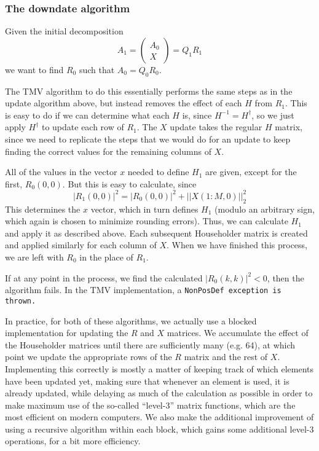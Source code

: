 \subsubsection{The downdate algorithm}
\label{QRDowndate_Algorithm}

Given the initial decomposition
\begin{equation*}
A_1 = \left(\begin{array}{c}A_0 \\ X \end{array}\right) = Q_1 R_1 
\end{equation*}
we want to find $R_0$ such that $A_0 = Q_0 R_0$.

The TMV algorithm to do this essentially performs the same steps as in the update
algorithm above,
but instead removes the effect of each $H$ from $R_1$.
This is easy to
do if we can determine what each $H$ is, since $H^{-1} = H^\dagger$, so we just
apply $H^\dagger$ to update each row of $R_1$.  The $X$ update takes
the regular $H$ matrix, since we need to replicate the steps that we would do
for an update to keep finding the correct values for the remaining columns of $X$.

All of the values in the vector $x$ needed to define $H_1$ are given, except for the first,
$R_0(0,0)$.  But this is easy to calculate, since
\begin{equation*}
|R_1(0,0)|^2 = |R_0(0,0)|^2 + ||X(1:M,0)||_2^2
\end{equation*}
This determines the $x$ vector, which in turn defines $H_1$
(modulo an arbitrary sign, which again is chosen to minimize rounding errors).
Thus, we can calculate $H_1$ and apply it as described above.  Each subsequent Householder
matrix is created and applied similarly for each column of $X$.  When we have finished
this process, we are left with $R_0$ in the place of $R_1$.

If at any point in the process, we find the calculated $|R_0(k,k)|^2 < 0$, then 
the algorithm fails.  In the TMV implementation, a \tt{NonPosDef} exception is thrown.

In practice, for both of these algorithms, we actually use a blocked implementation for updating
the $R$ and $X$ matrices.  We accumulate the effect of the Householder matrices until 
there are sufficiently many (e.g. 64), at which point we update the appropriate rows of the $R$
matrix and the rest of $X$.  Implementing this correctly is mostly a matter of keeping track
of which elements have been updated yet, making sure that whenever an element is used,
it is already updated, while delaying as much of the calculation as possible in order 
to make maximum
use of the so-called ``level-3'' matrix functions, which are the most efficient on modern computers.
We also make the additional improvement of using a recursive algorithm within each block,
which gains some additional level-3 operations, for a bit more efficiency.

